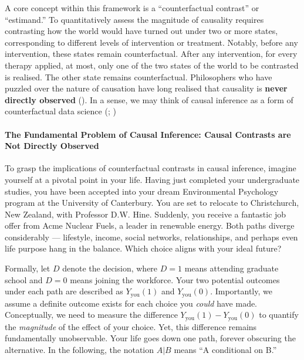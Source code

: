 \documentclass[
  singlecolumn]{article}
\let\oldparagraph\paragraph
\renewcommand{\paragraph}[1]{\oldparagraph{#1}\mbox{}}
\begin{document}
A core concept within this framework is a ``counterfactual contrast'' or
``estimand.'' To quantitatively assess the magnitude of causality
requires contrasting how the world would have turned out under two or
more states, corresponding to different levels of intervention or
treatment. Notably, before any intervention, these states remain
counterfactual. After any intervention, for every therapy applied, at
most, only one of the two states of the world to be contrasted is
realised. The other state remains counterfactual. Philosophers who have
puzzled over the nature of causation have long realised that causality
is \textbf{never directly observed} (). In a sense, we may think of causal inference as a form of
counterfactual data science (; )

\paragraph{The Fundamental Problem of Causal Inference: Causal Contrasts
are Not Directly
Observed}\label{the-fundamental-problem-of-causal-inference-causal-contrasts-are-not-directly-observed}

To grasp the implications of counterfactual contrasts in causal
inference, imagine yourself at a pivotal point in your life. Having just
completed your undergraduate studies, you have been accepted into your
dream Environmental Psychology program at the University of Canterbury.
You are set to relocate to Christchurch, New Zealand, with Professor
D.W. Hine. Suddenly, you receive a fantastic job offer from Acme Nuclear
Fuels, a leader in renewable energy. Both paths diverge considerably ---
lifestyle, income, social networks, relationships, and perhaps even life
purpose hang in the balance. Which choice aligns with your ideal future?

Formally, let \(D\) denote the decision, where \(D = 1\) means attending
graduate school and \(D = 0\) means joining the workforce. Your two
potential outcomes under each path are described as
\(Y_{\text{you}}(1)\) and \(Y_{\text{you}}(0)\). Importantly, we assume
a definite outcome exists for each choice you \emph{could} have made.
Conceptually, we need to measure the difference
\(Y_{\text{you}}(1) - Y_{\text{you}}(0)\) to quantify the
\emph{magnitude} of the effect of your choice. Yet, this difference
remains fundamentally unobservable. Your life goes down one path,
forever obscuring the alternative. In the following, the notation
\(A|B\) means ``A conditional on B.''
\end{document}

